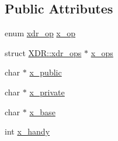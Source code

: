\subsection*{\-Public \-Attributes}
\begin{DoxyCompactItemize}
\item 
enum \hyperlink{include_2gmx__system__xdr_8h_a3055ce94f85d6aeec3b736d93b93a46a}{xdr\-\_\-op} \hyperlink{structXDR_ac51509abcf1204ea1ef2d7631cec3294}{x\-\_\-op}
\item 
struct \hyperlink{structXDR_1_1xdr__ops}{\-X\-D\-R\-::xdr\-\_\-ops} $\ast$ \hyperlink{structXDR_a1db48a837f054018101e935193a37795}{x\-\_\-ops}
\item 
char $\ast$ \hyperlink{structXDR_ae6273a214187a6ac600619e3f7cb169b}{x\-\_\-public}
\item 
char $\ast$ \hyperlink{structXDR_ad1715f744bce85d10ea75812630d67ed}{x\-\_\-private}
\item 
char $\ast$ \hyperlink{structXDR_a8a4670e3776f48cef9fad5f1db2990d4}{x\-\_\-base}
\item 
int \hyperlink{structXDR_a714d1886692afcceb5cb7917e4cb294d}{x\-\_\-handy}
\end{DoxyCompactItemize}


